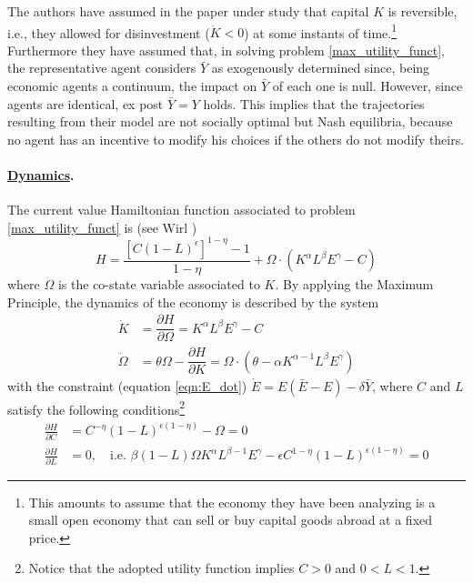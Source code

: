 The authors have assumed in the paper under study that capital $K$ is reversible, i.e., they allowed for disinvestment ($\dot{K}<0$) at some instants of time.\footnote{This amounts to assume that the economy they have been analyzing is a small open economy that can sell or buy capital goods abroad at a fixed price.} Furthermore they have assumed that, in solving problem \eqref{max_utility_funct}, the representative agent considers $\bar{Y}$ as exogenously determined since, being economic agents a continuum, the impact on $\bar{Y}$ of each one is null. However, since agents are identical, ex post $\bar{Y} = Y$ holds. This implies that the trajectories resulting from their model are not socially optimal but Nash equilibria, because no agent has an incentive to modify his choices if the others do not modify theirs.

\paragraph{\underline{Dynamics}.}
The current value Hamiltonian function associated to problem \eqref{max_utility_funct} is 
(see Wirl \cite{wirl_stability_1997}) 
$$H=\frac{[C(1-L)^{\epsilon}]^{1-\eta} -1}{1-\eta} + \Omega\cdot(K^\alpha L^\beta E^\gamma - C)$$
where $\Omega$ is the co-state variable associated to $K$. By applying the Maximum Principle, the dynamics of the economy is described by the system
\begin{equation} \label{eqn:K_dot_Omega_dot}
\begin{split}
	\dot{K}& =\dfrac{\partial H}{\partial\Omega} = K^\alpha L^\beta E^\gamma-C \\
	\dot{\Omega}& =\theta\Omega-\dfrac{\partial H}{\partial K}=\Omega\cdot(\theta-\alpha K^{\alpha-1}L^\beta E^\gamma)
\end{split}
\end{equation}
with the constraint (equation \eqref{eqn:E_dot}) $\dot{E} = E(\bar{E}-E)-\delta\bar{Y}$, where $C$ and $L$ satisfy the following conditions\footnote{Notice that the adopted utility function implies $C>0$ and $0<L<1$.} 
\begin{equation} 
\begin{split}
	\frac{\partial H}{\partial C}& =C^{-\eta}(1-L)^{\epsilon(1-\eta)}-\Omega=0 \\
	\frac{\partial H}{\partial L}& =0, \quad \text{i.e.}\,\, \beta(1-L)\Omega K^\alpha L^{\beta-1}E^\gamma-\epsilon C^{1-\eta}(1-L)^{\epsilon(1-\eta)}=0
\end{split}
\end{equation}

